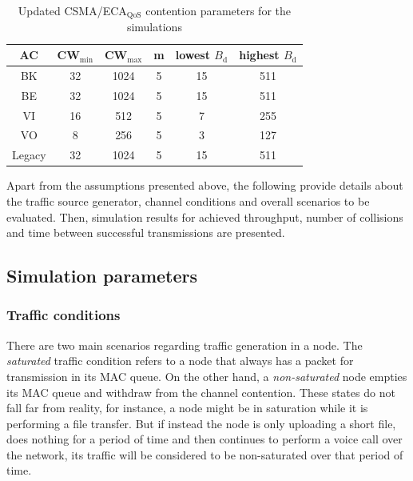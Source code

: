 	\begin{table}[t]
		\centering
		\caption{Updated CSMA/ECA$_{\text{QoS}}$ contention parameters for the simulations}
		\label{tab:newQoSparams}
		\begin{tabular}{|c|c|c|c|c|c|}
			\hline
			{\bfseries AC} & {\bfseries CW$_{\min}$} & {\bfseries CW$_{\max}$} & {\bfseries m} & {\bfseries lowest $B_{\text{d}}$} & {\bfseries highest $B_{\text{d}}$}\\
			\hline
			BK		       &	32				&		1024		  & 		5	&			15		        &		511\\
			BE		       &	32				&		1024		  &		5	&			15		        &		511\\
			VI		       &	16				&		512		  & 		5	&			7		     		   &		255\\
			VO		       &	8				&		256		  & 		5	&			3		        &		127\\
			Legacy	       &	32				&		1024		  & 		5	&			15		        &		511\\
			\hline
		\end{tabular}
	\end{table}
	
Apart from the assumptions presented above, the following provide details about the traffic source generator, channel conditions and overall scenarios to be evaluated. Then, simulation results for achieved throughput, number of collisions and time between successful transmissions are presented.

\subsection{Simulation parameters}\label{subsect:simParams}
\subsubsection{Traffic conditions}
There are two main scenarios regarding traffic generation in a node. The \emph{saturated} traffic condition refers to a node that always has a packet for transmission in its MAC queue. On the other hand, a \emph{non-saturated} node empties its MAC queue and withdraw from the channel contention. These states do not fall far from reality, for instance, a node might be in saturation while it is performing a file transfer. But if instead the node is only uploading a short file, does nothing for a period of time and then continues to perform a voice call over the network, its traffic will be considered to be non-saturated over that period of time.

